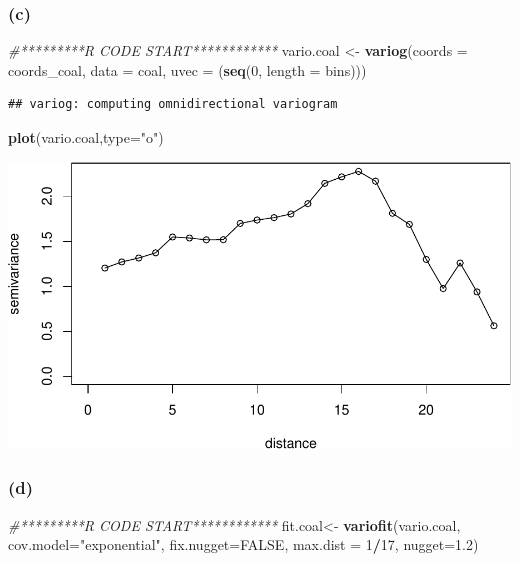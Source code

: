 \documentclass[]{article}
\newenvironment{Shaded}{\begin{snugshade}}{\end{snugshade}}
\newcommand{\KeywordTok}[1]{\textcolor[rgb]{0.13,0.29,0.53}{\textbf{#1}}}
\newcommand{\DataTypeTok}[1]{\textcolor[rgb]{0.13,0.29,0.53}{#1}}
\newcommand{\DecValTok}[1]{\textcolor[rgb]{0.00,0.00,0.81}{#1}}
\newcommand{\FloatTok}[1]{\textcolor[rgb]{0.00,0.00,0.81}{#1}}
\newcommand{\StringTok}[1]{\textcolor[rgb]{0.31,0.60,0.02}{#1}}
\newcommand{\CommentTok}[1]{\textcolor[rgb]{0.56,0.35,0.01}{\textit{#1}}}
\newcommand{\OtherTok}[1]{\textcolor[rgb]{0.56,0.35,0.01}{#1}}
\newcommand{\OperatorTok}[1]{\textcolor[rgb]{0.81,0.36,0.00}{\textbf{#1}}}
\newcommand{\NormalTok}[1]{#1}
\begin{document}
\subsubsection{(c)}\label{c-1}

\begin{Shaded}
\begin{Highlighting}[]
\CommentTok{#*********R CODE START************}
\NormalTok{vario.coal <-}\StringTok{ }\KeywordTok{variog}\NormalTok{(}\DataTypeTok{coords =}\NormalTok{ coords_coal,}
                     \DataTypeTok{data =}\NormalTok{ coal, }\DataTypeTok{uvec =}\NormalTok{ (}\KeywordTok{seq}\NormalTok{(}\DecValTok{0}\NormalTok{, }\DataTypeTok{length =}\NormalTok{ bins)))}
\end{Highlighting}
\end{Shaded}

\begin{verbatim}
## variog: computing omnidirectional variogram
\end{verbatim}

\begin{Shaded}
\begin{Highlighting}[]
\KeywordTok{plot}\NormalTok{(vario.coal,}\DataTypeTok{type=}\StringTok{"o"}\NormalTok{)}
\end{Highlighting}
\end{Shaded}

\includegraphics{homework2_files/figure-latex/ex7_c-1.pdf}

\subsubsection{(d)}\label{d}

\begin{Shaded}
\begin{Highlighting}[]
\CommentTok{#*********R CODE START************}
\NormalTok{fit.coal<-}\StringTok{ }\KeywordTok{variofit}\NormalTok{(vario.coal,}
                    \DataTypeTok{cov.model=}\StringTok{"exponential"}\NormalTok{,}
                    \DataTypeTok{fix.nugget=}\OtherTok{FALSE}\NormalTok{,}
                    \DataTypeTok{max.dist =} \DecValTok{1}\OperatorTok{/}\DecValTok{17}\NormalTok{, }\DataTypeTok{nugget=}\FloatTok{1.2}\NormalTok{)}
\end{Highlighting}
\end{Shaded}
\end{document}

